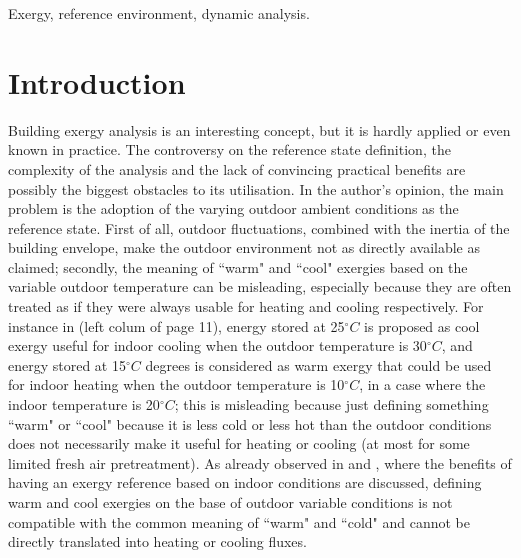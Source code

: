 \documentclass[10pt]{extarticle} %
\begin{document}
{\sffamily\normalsize Exergy, reference environment, dynamic analysis.}


\section{Introduction} 

\sffamily\normalsize


Building exergy analysis is an interesting concept, but it is hardly applied or even known in practice. The controversy on the reference state definition, the complexity of the analysis and the lack of convincing practical benefits are possibly the biggest obstacles to its utilisation. In the author's opinion, the main problem is the adoption of the varying outdoor ambient conditions as the reference state. First of all, outdoor fluctuations, combined with the inertia of the building envelope, make the outdoor environment not as directly available as claimed; secondly, the meaning of ``warm" and ``cool" exergies based on the variable outdoor temperature can be misleading, especially because they are often treated as if they were always usable for heating and cooling respectively. For instance in \cite{Choi2020} (left colum of page 11), energy stored at 25$^\circ C$ is proposed as cool exergy useful for indoor cooling when the outdoor temperature is 30$^\circ C$, and energy stored at 15$^\circ C$ degrees is considered as warm exergy that could be used for indoor heating when the outdoor temperature is 10$^\circ C$, in a case where the indoor temperature is 20$^\circ C$; this is misleading because just defining something ``warm" or ``cool" because it is less cold or less hot than the outdoor conditions does not necessarily make it useful for heating or cooling (at most for some limited fresh air pretreatment). As already observed in \cite{Bonetti2016} and \cite{Bonetti2017a}, where the benefits of having an exergy reference based on indoor conditions are discussed, defining warm and cool exergies on the base of outdoor variable conditions is not compatible with the common meaning of ``warm" and ``cold" and cannot be directly translated into heating or cooling fluxes.
\end{document}

